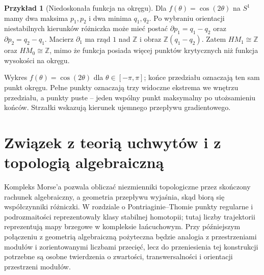 \documentclass[11pt,a4paper,oneside]{report}
\newcommand{\Z}{\mathbb{Z}}
\theoremstyle{plain}
\theoremstyle{definition}
\newtheorem{przyklad}[twierdzenie]{Przykład}
\theoremstyle{remark}
\begin{document}
\begin{przyklad}[Niedoskonała funkcja na okręgu]
Dla $f(\theta)=\cos(2\theta)$ na $S^1$ mamy dwa maksima
$p_1,p_2$ i dwa minima $q_1,q_2$. Po wybraniu orientacji
niestabilnych kierunków różniczka może mieć postać
$\partial p_1=q_1-q_2$ oraz $\partial p_2=q_2-q_1$.
Macierz $\partial_1$ ma rząd $1$ nad $\Z$ i obraz
$\Z(q_1-q_2)$. Zatem $HM_1\cong\Z$ oraz
$HM_0\cong\Z$, mimo że funkcja posiada więcej punktów
krytycznych niż funkcja wysokości na okręgu.
\end{przyklad}

\begin{center}
\end{center}
\begin{center}\small Wykres $f(\theta)=\cos(2\theta)$ dla
$\theta\in[-\pi,\pi]$; końce przedziału oznaczają ten sam
punkt okręgu. Pełne punkty oznaczają trzy widoczne ekstrema
we wnętrzu przedziału, a punkty puste -- jeden wspólny
punkt maksymalny po utożsamieniu końców. Strzałki wskazują
kierunek ujemnego przepływu gradientowego.\end{center}

\section{Związek z teorią uchwytów i z topologią algebraiczną}
Kompleks Morse'a pozwala obliczać niezmienniki topologiczne
przez skończony rachunek algebraiczny, a geometria przepływu
wyjaśnia, skąd biorą się współczynniki różniczki.
W rozdziale o Pontriaginie--Thomie punkty regularne
i podrozmaitości reprezentowały klasy stabilnej homotopii;
tutaj liczby trajektorii reprezentują mapy brzegowe w
kompleksie łańcuchowym. Przy późniejszym połączeniu z geometrią algebraiczną
pożyteczna będzie analogia z przestrzeniami modułów i
zorientowanymi liczbami przecięć, lecz do przeniesienia tej
konstrukcji potrzebne są osobne twierdzenia o zwartości,
transwersalności i orientacji przestrzeni modułów.
\end{document}
